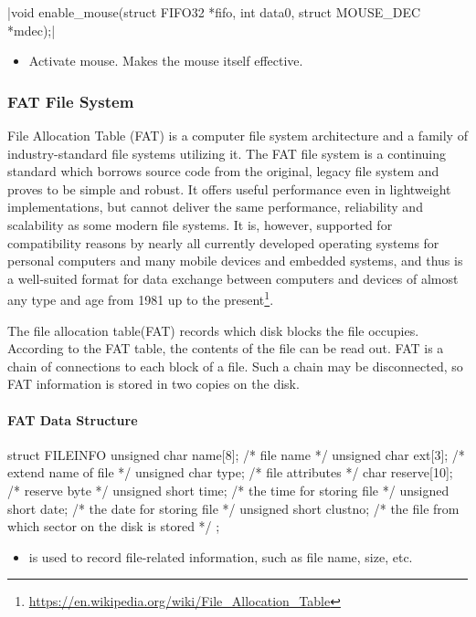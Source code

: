 \documentclass{swfcthesis}
\begin{document}
\csingle|void enable_mouse(struct FIFO32 *fifo, int data0, struct MOUSE_DEC *mdec);|
\begin{itemize}
\item Activate mouse. Makes the mouse itself effective.
\end{itemize}

\subsubsection{FAT File System}
\label{sec:fat}

File Allocation Table (FAT) is a computer file system architecture and a family of
industry-standard file systems utilizing it. The FAT file system is a continuing standard
which borrows source code from the original, legacy file system and proves to be simple
and robust. It offers useful performance even in lightweight implementations, but cannot
deliver the same performance, reliability and scalability as some modern file systems. It
is, however, supported for compatibility reasons by nearly all currently developed
operating systems for personal computers and many mobile devices and embedded systems, and
thus is a well-suited format for data exchange between computers and devices of almost any
type and age from 1981 up to the
present\footnote{\url{https://en.wikipedia.org/wiki/File_Allocation_Table}}.


The file allocation table(FAT) records which disk blocks the file occupies. According to
the FAT table, the contents of the file can be read out. FAT is a chain of connections to
each block of a file. Such a chain may be disconnected, so FAT information is stored in
two copies on the disk.
  
\paragraph{FAT Data Structure}

\begin{codeblock}[1]
\begin{ccode}
struct FILEINFO
{ 
  unsigned char name[8];   /* file name */
  unsigned char ext[3];    /* extend name of file */
  unsigned char type;      /* file attributes */
  char reserve[10];        /* reserve byte */
  unsigned short time;     /* the time for storing file */
  unsigned short date;     /* the date for storing file */
  unsigned short  clustno; /* the file from which sector on the disk is stored */
};
\end{ccode}
\end{codeblock}
\begin{itemize}
\item is used to record file-related information, such as file name, size, etc.
\end{itemize}
\end{document}
